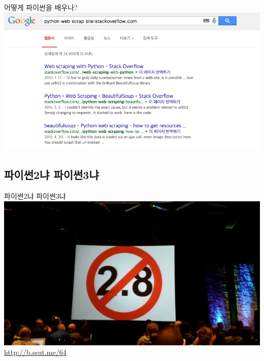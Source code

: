\documentclass[10pt]{beamer}
\begin{document}
\begin{frame}{어떻게 파이썬을 배우나?}{}
\includegraphics[scale=0.4]{contents/google.jpg}
\end{frame}

\subsection{파이썬2냐 파이썬3냐}
\begin{frame}{파이썬2냐 파이썬3냐}{}
\centering
\includegraphics[scale=0.5]{contents/python28.jpg}\\
\tiny{\url{http://b.ssut.me/64}}
\end{frame}
\end{document}
